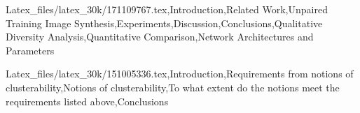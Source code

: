 Latex_files/latex_30k/171109767.tex,Introduction,Related Work,Unpaired Training Image Synthesis,Experiments,Discussion,Conclusions,Qualitative Diversity Analysis,Quantitative Comparison,Network Architectures and Parameters

Latex_files/latex_30k/151005336.tex,Introduction,Requirements from notions of clusterability,Notions of clusterability,To what extent do the notions meet the requirements listed above,Conclusions
